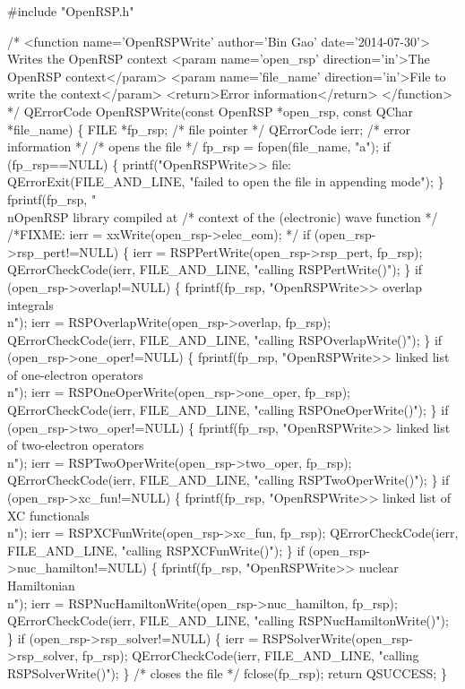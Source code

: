 #include "OpenRSP.h"

/* <function name='OpenRSPWrite' author='Bin Gao' date='2014-07-30'>
     Writes the OpenRSP context
     <param name='open_rsp' direction='in'>The OpenRSP context</param>
     <param name='file_name' direction='in'>File to write the context</param>
     <return>Error information</return>
   </function> */
QErrorCode OpenRSPWrite(const OpenRSP *open_rsp, const QChar *file_name)
\{
    FILE *fp_rsp;     /* file pointer */
    QErrorCode ierr;  /* error information */
    /* opens the file */
    fp_rsp = fopen(file_name, "a");
    if (fp_rsp==NULL) \{
        printf("OpenRSPWrite>> file: %
        QErrorExit(FILE_AND_LINE, "failed to open the file in appending mode");
    \}
    fprintf(fp_rsp, "\\nOpenRSP library compiled at %
    /* context of the (electronic) wave function */
    /*FIXME: ierr = xxWrite(open_rsp->elec_eom); */
    if (open_rsp->rsp_pert!=NULL) \{
        ierr = RSPPertWrite(open_rsp->rsp_pert, fp_rsp);
        QErrorCheckCode(ierr, FILE_AND_LINE, "calling RSPPertWrite()");
    \}
    if (open_rsp->overlap!=NULL) \{
        fprintf(fp_rsp, "OpenRSPWrite>> overlap integrals\\n");
        ierr = RSPOverlapWrite(open_rsp->overlap, fp_rsp);
        QErrorCheckCode(ierr, FILE_AND_LINE, "calling RSPOverlapWrite()");
    \}
    if (open_rsp->one_oper!=NULL) \{
        fprintf(fp_rsp, "OpenRSPWrite>> linked list of one-electron operators\\n");
        ierr = RSPOneOperWrite(open_rsp->one_oper, fp_rsp);
        QErrorCheckCode(ierr, FILE_AND_LINE, "calling RSPOneOperWrite()");
    \}
    if (open_rsp->two_oper!=NULL) \{
        fprintf(fp_rsp, "OpenRSPWrite>> linked list of two-electron operators\\n");
        ierr = RSPTwoOperWrite(open_rsp->two_oper, fp_rsp);
        QErrorCheckCode(ierr, FILE_AND_LINE, "calling RSPTwoOperWrite()");
    \}
    if (open_rsp->xc_fun!=NULL) \{
        fprintf(fp_rsp, "OpenRSPWrite>> linked list of XC functionals\\n");
        ierr = RSPXCFunWrite(open_rsp->xc_fun, fp_rsp);
        QErrorCheckCode(ierr, FILE_AND_LINE, "calling RSPXCFunWrite()");
    \}
    if (open_rsp->nuc_hamilton!=NULL) \{
        fprintf(fp_rsp, "OpenRSPWrite>> nuclear Hamiltonian\\n");
        ierr = RSPNucHamiltonWrite(open_rsp->nuc_hamilton, fp_rsp);
        QErrorCheckCode(ierr, FILE_AND_LINE, "calling RSPNucHamiltonWrite()");
    \}
    if (open_rsp->rsp_solver!=NULL) \{
        ierr = RSPSolverWrite(open_rsp->rsp_solver, fp_rsp);
        QErrorCheckCode(ierr, FILE_AND_LINE, "calling RSPSolverWrite()");
    \}
    /* closes the file */
    fclose(fp_rsp);
    return QSUCCESS;
\}

